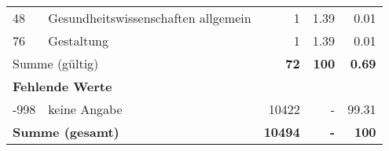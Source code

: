 \begin{longtable}{lXrrr}
     48 &
     \multicolumn{1}{X}{ Gesundheitswissenschaften allgemein   } &


       \num{1} &
       \num[round-mode=places,round-precision=2]{1,39} &
         \num[round-mode=places,round-precision=2]{0,01} \\

     76 &
     \multicolumn{1}{X}{ Gestaltung   } &


       \num{1} &
       \num[round-mode=places,round-precision=2]{1,39} &
         \num[round-mode=places,round-precision=2]{0,01} \\
     \midrule
     \multicolumn{2}{l}{Summe (gültig)} &
       \textbf{\num{72}} &
     \textbf{100} &
       \textbf{\num[round-mode=places,round-precision=2]{0,69}} \\
     \multicolumn{5}{l}{\textbf{Fehlende Werte}}\\
       -998 &
       keine Angabe &
         \num{10422} &
        - &
         \num[round-mode=places,round-precision=2]{99,31} \\
     \midrule
     \multicolumn{2}{l}{\textbf{Summe (gesamt)}} &
          \textbf{\num{10494}} &
        \textbf{-} &
        \textbf{100} \\
     \bottomrule
     \end{longtable}
     
